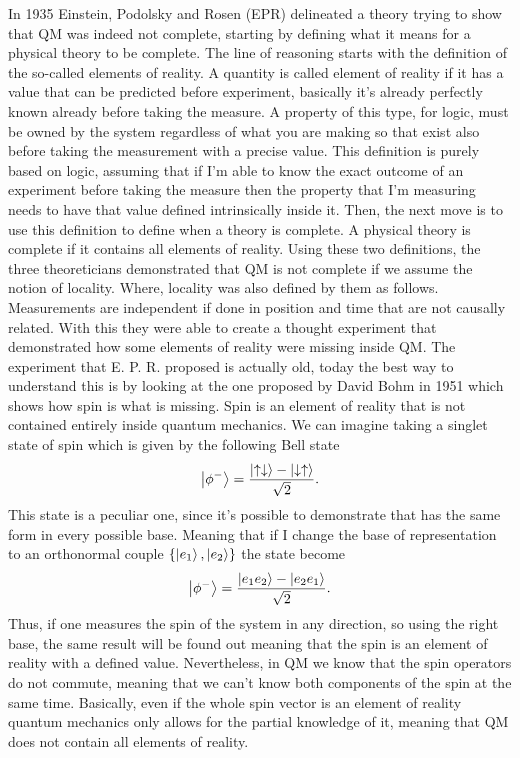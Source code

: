 In 1935 Einstein, Podolsky and Rosen (EPR) delineated a theory trying to show that QM was indeed not complete, starting by defining what it means for a physical theory to be complete. The line of reasoning starts with the definition of the so-called elements of reality.
{
    A quantity is called element of reality if it has a value that can be predicted before experiment, basically it's already perfectly known already before taking the measure. A property of this type, for logic, must be owned by the system regardless of what you are making so that exist also before taking the measurement with a precise value.
}
\noindent
This definition is purely based on logic, assuming that if I'm able to know the exact outcome of an experiment before taking the measure then the property that I'm measuring needs to have that value defined intrinsically inside it. Then, the next move is to use this definition to define when a theory is complete.
{
    A physical theory is complete if it contains all elements of reality.
}
\noindent
Using these two definitions, the three theoreticians demonstrated that QM is not complete if we assume the notion of locality. Where, locality was also defined by them as follows.
{
    Measurements are independent if done in position and time that are not causally related.
}
\noindent
With this they were able to create a thought experiment that demonstrated how some elements of reality were missing inside QM. The experiment that E. P. R. proposed is actually old, today the best way to understand this is by looking at the one proposed by David Bohm in 1951 which shows how spin is what is missing.
{
    Spin is an element of reality that is not contained entirely inside quantum mechanics.
}
{
    We can imagine taking a singlet state of spin which is given by the following Bell state
    \begin{equation}
        \ket{\phi^-} = \frac{\ket{\uparrow\downarrow} - \ket{\downarrow\uparrow}}{\sqrt{2}}.
    \end{equation}
    This state is a peculiar one, since it's possible to demonstrate that has the same form in every possible base. Meaning that if I change the base of representation to an orthonormal couple $\{ \ket{e_1}, \ket{e_2} \}$ the state become
    \begin{equation}
        \ket{\phi^-} = \frac{\ket{e_1e_2} - \ket{e_2e_1}}{\sqrt{2}}.
    \end{equation}
    Thus, if one measures the spin of the system in any direction, so using the right base, the same result will be found out meaning that the spin is an element of reality with a defined value. Nevertheless, in QM we know that the spin operators do not commute, meaning that we can't know both components of the spin at the same time. Basically, even if the whole spin vector is an element of reality quantum mechanics only allows for the partial knowledge of it, meaning that QM does not contain all elements of reality.
}
